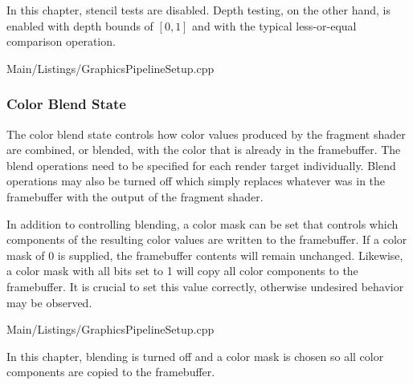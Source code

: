         In this chapter, stencil tests are disabled.
        Depth testing, on the other hand, is enabled with depth bounds of $[0, 1]$ and with the typical less-or-equal comparison operation.

        
        {Main/Listings/GraphicsPipelineSetup.cpp}

      \subsubsection{Color Blend State}
        The color blend state controls how color values produced by the fragment shader are combined, or blended, with the color that is already in the framebuffer.
        The blend operations need to be specified for each render target individually.
        Blend operations may also be turned off which simply replaces whatever was in the framebuffer with the output of the fragment shader.

        In addition to controlling blending, a color mask can be set that controls which components of the resulting color values are written to the framebuffer.
        If a color mask of 0 is supplied, the framebuffer contents will remain unchanged.
        Likewise, a color mask with all bits set to 1 will copy all color components to the framebuffer.
        It is crucial to set this value correctly, otherwise undesired behavior may be observed.

        
        {Main/Listings/GraphicsPipelineSetup.cpp}

        In this chapter, blending is turned off and a color mask is chosen so all color components are copied to the framebuffer.


